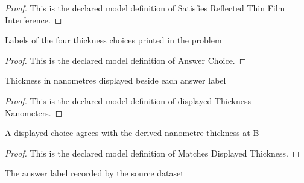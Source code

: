 \begin{proof}
  This is the declared model definition of Satisfies Reflected Thin Film Interference.
\end{proof}
\begin{definition}
  \label{def:physics:phyx-mini-0151:phyxminiproblems-problemphyxmini0151-answerchoice}
  Labels of the four thickness choices printed in the problem
\end{definition}
\begin{proof}
  This is the declared model definition of Answer Choice.
\end{proof}
\begin{definition}
  \label{def:physics:phyx-mini-0151:phyxminiproblems-problemphyxmini0151-displayedthicknessnanometers}
  Thickness in nanometres displayed beside each answer label
\end{definition}
\begin{proof}
  This is the declared model definition of displayed Thickness Nanometers.
\end{proof}
\begin{definition}
  \label{def:physics:phyx-mini-0151:phyxminiproblems-problemphyxmini0151-matchesdisplayedthickness}
  A displayed choice agrees with the derived nanometre thickness at B
\end{definition}
\begin{proof}
  This is the declared model definition of Matches Displayed Thickness.
\end{proof}
\begin{definition}
  \label{def:physics:phyx-mini-0151:phyxminiproblems-problemphyxmini0151-recordeddatasetanswer}
  The answer label recorded by the source dataset
\end{definition}
